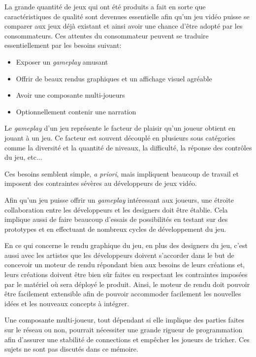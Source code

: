 \documentclass[12pt,oneside,letterpaper,francais]{book}
\begin{document}
La grande quantité de jeux qui ont été produits a fait en sorte que
caractéristiques de qualité sont devenues essentielle afin qu'un jeu
vidéo puisse se comparer aux jeux déjà existant et ainsi avoir une
chance d'être adopté par les consommateurs. Ces attentes du
consommateur peuvent se traduire essentiellement par les besoins
suivant:

\begin{itemize}
\item Exposer un \textit{gameplay} amusant
\item Offrir de beaux rendus graphiques et un affichage visuel
  agréable
\item Avoir une composante multi-joueurs
\item Optionnellement contenir une narration 
\end{itemize}

Le \textit{gameplay} d'un jeu représente le facteur de plaisir qu'un
joueur obtient en jouant à un jeu. Ce facteur est souvent découplé en
plusieurs sous catégories comme la diversité et la quantité de
niveaux, la difficulté, la réponse des contrôles du jeu, etc...

Ces besoins semblent simple, \textit{a priori}, mais impliquent
beaucoup de travail et imposent des contraintes sévères au
développeurs de jeux vidéo.

Afin qu'un jeu puisse offrir un \textit{gameplay} intéressant aux
joueurs, une étroite collaboration entre les développeurs et les
designers doit être établie. Cela implique aussi de faire beaucoup
d'essais de possibilités en testant sur des prototypes et en
effectuant de nombreux cycles de développement du jeu.

En ce qui concerne le rendu graphique du jeu, en plus des designers du
jeu, c'est aussi avec les artistes que les développeurs doivent
s'accorder dans le but de concevoir un moteur de rendu répondant bien
aux besoins de leurs créations et, leurs créations doivent être bien
sûr faites en respectant les contraintes imposées par le matériel où
sera déployé le produit. Ainsi, le moteur de rendu doit pouvoir être
facilement extensible afin de pouvoir accommoder facilement les
nouvelles idées et les nouveaux concepts à intégrer.

Une composante multi-joueur, tout dépendant si elle implique des
parties faites sur le réseau ou non, pourrait nécessiter une grande
rigueur de programmation afin d'assurer une stabilité de connections et
empêcher les joueurs de tricher. Ces sujets ne sont pas discutés dans
ce mémoire.
\end{document}
